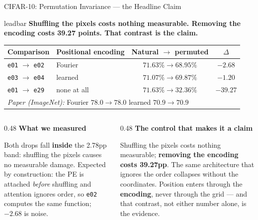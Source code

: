 \documentclass[aspectratio=169,11pt]{beamer}
\newcommand{\lead}[1]{%
  \begin{beamercolorbox}[wd=\textwidth,sep=5pt,center]{leadbar}%
    \small\bfseries #1%
  \end{beamercolorbox}\vspace{0.6em}}
\newcommand{\colhead}[1]{{\color{HeadBlue}\bfseries #1}\par\vspace{0.25em}}
\begin{document}
\begin{frame}[shrink=11]{CIFAR-10: Permutation Invariance --- the Headline Claim}
  \lead{Shuffling the pixels costs nothing measurable. Removing the encoding costs 39.27 points. That contrast is the claim.}
  \begin{table}
    \centering\small
    \begin{tabular}{llcc}
      \toprule
      \textbf{Comparison} & \textbf{Positional encoding} & \textbf{Natural $\to$ permuted} & \textbf{$\Delta$} \\
      \midrule
      \texttt{e01} $\to$ \texttt{e02} & Fourier & $71.63\% \to 68.95\%$ & $-2.68$ \\
      \texttt{e03} $\to$ \texttt{e04} & learned & $71.07\% \to 69.87\%$ & $-1.20$ \\
      \midrule
      \texttt{e01} $\to$ \texttt{e29} & \alert{none at all} & $71.63\% \to 32.36\%$ & \textcolor{AccentRed}{$\mathbf{-39.27}$} \\
      \midrule
      \multicolumn{4}{l}{\textit{Paper (ImageNet):} Fourier $78.0 \to 78.0$ \quad learned $70.9 \to 70.9$} \\
      \bottomrule
    \end{tabular}
  \end{table}

  \vspace{0.4em}
  \begin{columns}[T]
    \begin{column}{0.48\textwidth}
      \colhead{What we measured}
        \small
        Both drops fall \textbf{inside} the 2.78pp band: shuffling the pixels causes no measurable damage. Expected by construction: the PE is attached \emph{before} shuffling and attention ignores order, so \texttt{e02} computes the same function; $-2.68$ is noise.
      
    \end{column}
    \begin{column}{0.48\textwidth}
      \colhead{The control that makes it a claim}
        \small
        Shuffling the pixels costs nothing measurable; \textbf{removing the encoding costs 39.27pp}. The same architecture that ignores the order collapses without the coordinates. Position enters through the \textbf{encoding}, never through the grid --- and that contrast, not either number alone, is the evidence.
      
    \end{column}
  \end{columns}
\end{frame}
\end{document}
